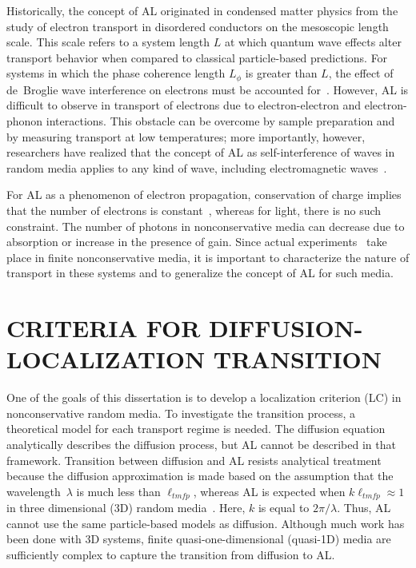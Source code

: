 Historically, the concept of AL originated in condensed matter physics from the study of electron transport in disordered conductors on the mesoscopic length scale. This scale refers to a system length $L$ at which quantum wave effects alter transport behavior when compared to classical particle-based predictions. For systems in which the phase coherence length $L_{\phi}$ is greater than $L$, the effect of de~Broglie wave interference on electrons must be accounted for~\cite{2009_Lagendijk_PT,1985_Lee,1988_Webb_Washburn,1991_Altshuler}. However, AL is difficult to observe in transport of electrons due to electron-electron and electron-phonon interactions. This obstacle can be overcome by sample preparation and by measuring transport at low temperatures; more importantly, however, researchers have realized that the concept of AL as self-interference of waves in random media applies to any kind of wave, including electromagnetic waves~\cite{1984_John_prl,1985_Anderson}. 

For AL as a phenomenon of electron propagation, conservation of charge implies that the number of electrons is constant~\cite{1991_Altshuler}, whereas for light, there is no such constraint. The number of photons in nonconservative media can decrease due to absorption or increase in the presence of gain. Since actual experiments~\cite{2009_Lagendijk_PT,2000_chabanov_nature,1997_wiersma_nature,1991_Genack} take place in finite nonconservative media, it is important to characterize the nature of transport in these systems and to generalize the concept of AL for such media.

\section{CRITERIA FOR DIFFUSION-LOCALIZATION TRANSITION}
\label{sec:thesis_statement}
One of the goals of this dissertation is to develop a localization criterion (LC) in nonconservative random media. To investigate the transition process, a theoretical model for each transport regime is needed. The diffusion equation analytically describes the diffusion process, but AL cannot be described in that framework. Transition between diffusion and AL resists analytical treatment because the diffusion approximation is made based on the assumption that the wavelength~$\lambda$ is much less than $\ell_{tmfp}$, whereas AL is expected when $k \ell_{tmfp} \approx 1$ in three dimensional (3D) random media~\cite{1960_Ioffe_criterion}. Here, $k$ is equal to $2 \pi/\lambda$. Thus, AL cannot use the same particle-based models as diffusion. Although much work has been done with 3D systems, finite quasi-one-dimensional (quasi-1D) media are sufficiently complex to capture the transition from diffusion to AL.

